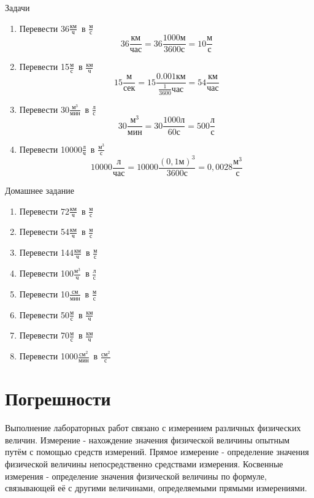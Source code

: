 \documentclass[a6paper, 11pt]{diss_4}
\newcommand{\kmh}{$\frac{км}{ч}$\ }
\newcommand{\ms}{$\frac{м}{с}$\ }
\newcommand{\lh}{$\frac{л}{ч}$\ }
\newcommand{\ls}{$\frac{л}{с}$\ }
\newcommand{\mks}{$\frac{м^3}{с}$\ }
\newcommand{\mkm}{$\frac{м^3}{мин}$\ }
\newcommand{\mkh}{$\frac{м^3}{ч}$\ }
\newcommand{\smm}{$\frac{см}{мин}$\ }
\newcommand{\smkvm}{$\frac{см^2}{мин}$\ }
\newcommand{\mkvs}{$\frac{см^2}{с}$\ }
\renewcommand{\'}{\,'}
\begin{document}
\begin{center}
Задачи
\end{center}

\begin{enumerate}
  \item{ Перевести  36\kmh в \ms \\
  \[36\frac{км}{час}=36\frac{1000 м}{3600 с}=10\frac{м}{с}\]
  }
  \item{ Перевести 15\ms в \kmh \\
  \[15\frac{м}{сек}=15\frac{0.001 км}{\frac{1}{3600} час}=54\frac{км}{час}\]
  }
  \item{ Перевести 30\mkm в \ls \\
  \[30\frac{м^3}{мин}=30\frac{1000 л}{60 с}=500\frac{л}{с}\]
  }
  \item{ Перевести 10000\lh в \mks \\
  \[10000\frac{л}{час}=10000\frac{(0,1м)^3}{3600 с}=0,0028\frac{м^3}{с}\]
  }
\end{enumerate}

\begin{center}
Домашнее задание
\end{center}

\begin{enumerate}
  \item Перевести 72\kmh в \ms
  \item Перевести 54\kmh в \ms
  \item Перевести 144\kmh в \ms
  \item Перевести 100\mkh в \ls
  \item Перевести 10\smm в \ms
  \item Перевести 50\ms в \kmh
  \item Перевести 70\ms в \kmh
  \item Перевести 1000\smkvm в \mkvs
\end{enumerate}
\newpage

\section{Погрешности}

  Выполнение лабораторных работ связано с измерением различных физических
величин. Измерение - нахождение значения физической величины опытным путём с
помощью средств измерений. Прямое измерение - определение значения физической
величины непосредственно средствами измерения. Косвенные измерения -
определение значения физической величины по формуле, связывающей её с другими
величинами, определяемыми прямыми измерениями.
\end{document}
